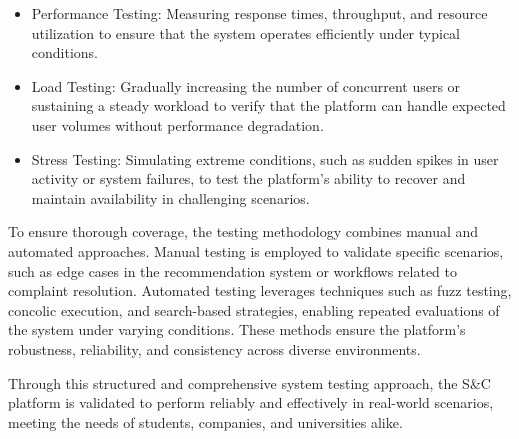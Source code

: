 \begin{itemize}
\item Performance Testing: Measuring response times, throughput, and resource utilization to ensure that the
system operates efficiently under typical conditions.
\item Load Testing: Gradually increasing the number of concurrent users or sustaining a steady workload to
verify that the platform can handle expected user volumes without performance degradation.
\item Stress Testing: Simulating extreme conditions, such as sudden spikes in user activity or system failures,
to test the platform’s ability to recover and maintain availability in challenging scenarios.
\end{itemize}

To ensure thorough coverage, the testing methodology combines manual and automated approaches.
Manual testing is employed to validate specific scenarios, such as edge cases in the recommendation
system or workflows related to complaint resolution. Automated testing leverages techniques such as
fuzz testing, concolic execution, and search-based strategies, enabling repeated evaluations of the
system under varying conditions. These methods ensure the platform’s robustness, reliability, and
consistency across diverse environments.

Through this structured and comprehensive system testing approach, the S\&C platform is validated
to perform reliably and effectively in real-world scenarios, meeting the needs of students,
companies, and universities alike.